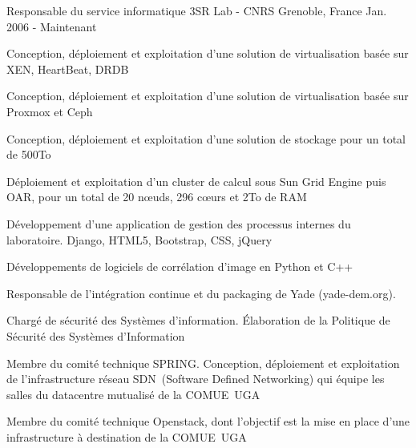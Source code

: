 

\begin{cventries}

  \cventry
    {Responsable du service informatique} %
    {3SR Lab - CNRS} %
    {Grenoble, France} %
    {Jan. 2006 - Maintenant} %
    {
      \begin{cvitems} %
        \item {Conception, déploiement et exploitation d'une solution de virtualisation basée sur XEN, HeartBeat, DRDB}
        \item {Conception, déploiement et exploitation d'une solution de virtualisation basée sur Proxmox et Ceph}
        \item {Conception, déploiement et exploitation d'une solution de stockage pour un total de 500To}
        \item {Déploiement et exploitation d'un cluster de calcul sous Sun Grid Engine puis OAR, pour un total de 20 nœuds, 296 cœurs et 2To de RAM}
        \item {Développement d'une application de gestion des processus internes du laboratoire. Django, HTML5, Bootstrap, CSS, jQuery}
        \item {Développements de logiciels de corrélation d'image en Python et C++}
        \item {Responsable de l'intégration continue et du packaging de Yade (yade-dem.org).}
        \item {Chargé de sécurité des Systèmes d'information. Élaboration de la Politique de Sécurité des Systèmes d'Information}
	\item {Membre du comité technique SPRING. Conception, déploiement et exploitation de l'infrastructure réseau SDN (Software Defined Networking) qui équipe les salles du datacentre mutualisé de la COMUE UGA}
        \item {Membre du comité technique Openstack, dont l'objectif est la mise en place d'une infrastructure à destination de la COMUE UGA}
      \end{cvitems}
    }


\end{cventries}
